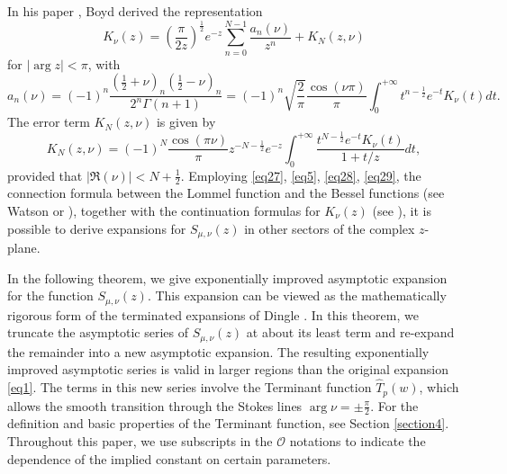 \documentclass[a4paper,twoside,10pt]{amsart}
\numberwithin{equation}{section}
\begin{document}
In his paper \cite{Boyd}, Boyd derived the representation
\begin{equation}\label{eq28}
K_\nu  \left( z \right) = \left( {\frac{\pi }{2z}} \right)^{\frac{1}{2}} e^{ - z} \sum\limits_{n = 0}^{N - 1} {\frac{{a_n\left( \nu  \right)}}{{z^n }}}  + K_N \left( {z,\nu } \right)
\end{equation}
for $\left|\arg z\right| < \pi$, with
\[
a_n \left( \nu  \right) = \left( { - 1} \right)^n \frac{{\left( {\frac{1}{2} + \nu } \right)_n \left( {\frac{1}{2} - \nu } \right)_n }}{{2^n \Gamma \left( {n + 1} \right)}} = \left( { - 1} \right)^n \sqrt {\frac{2}{\pi }} \frac{{\cos \left( {\nu \pi } \right)}}{\pi }\int_0^{ + \infty } {t^{n - \frac{1}{2}}e^{ - t} K_\nu  \left( t \right) dt} .
\]
The error term $K_N\left( {z,\nu } \right)$ is given by
\begin{equation}\label{eq29}
K_N \left( {z,\nu } \right) = \left( { - 1} \right)^N \frac{{\cos \left( {\pi \nu} \right)}}{\pi }z^{ - N - \frac{1}{2}} e^{ - z} \int_0^{ + \infty } {\frac{{t^{N - \frac{1}{2}} e^{ - t} K_\nu  \left( t \right)}}{{1 + t/z}}dt} ,
\end{equation}
provided that $\left| {\Re \left( \nu  \right)} \right| < N + \frac{1}{2}$. Employing \eqref{eq27}, \eqref{eq5}, \eqref{eq28}, \eqref{eq29}, the connection formula between the Lommel function and the Bessel functions (see Watson \cite[p. 347, expression (3)]{Watson} or \cite[11.9.E5]{NIST}), together with the continuation formulas for $K_\nu  \left( z \right)$ (see \cite[10.34.E4]{NIST}), it is possible to derive expansions for $S_{\mu ,\nu } \left( z \right)$ in other sectors of the complex $z$-plane.

In the following theorem, we give exponentially improved asymptotic expansion for the function $S_{\mu ,\nu } \left( z \right)$. This expansion can be viewed as the mathematically rigorous form of the terminated expansions of Dingle \cite[pp. 442--444]{Dingle}. In this theorem, we truncate the asymptotic series of $S_{\mu ,\nu } \left( z \right)$ at about its least term and re-expand the remainder into a new asymptotic expansion. The resulting exponentially improved asymptotic series is valid in larger regions than the original expansion \eqref{eq1}. The terms in this new series involve the Terminant function $\widehat T_p\left(w\right)$, which allows the smooth transition through the Stokes lines $\arg \nu = \pm \frac{\pi}{2}$. For the definition and basic properties of the Terminant function, see Section \ref{section4}. Throughout this paper, we use subscripts in the $\mathcal{O}$ notations to indicate the dependence of the implied constant on certain parameters.
\end{document}
